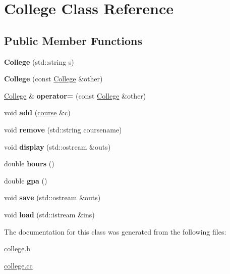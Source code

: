 \hypertarget{classCollege}{}\section{College Class Reference}
\label{classCollege}
\subsection*{Public Member Functions}
\begin{DoxyCompactItemize}
\item 
\hypertarget{classCollege_adabaf4087355e83f9f7d39f1e1498b41}{}\label{classCollege_adabaf4087355e83f9f7d39f1e1498b41} 
{\bfseries College} (std\+::string s)
\item 
\hypertarget{classCollege_ad007ad488e5a7ef986114080d0c8e101}{}\label{classCollege_ad007ad488e5a7ef986114080d0c8e101} 
{\bfseries College} (const \hyperlink{classCollege}{College} \&other)
\item 
\hypertarget{classCollege_af2194c9b37f80d13dc3fdba6784b18e8}{}\label{classCollege_af2194c9b37f80d13dc3fdba6784b18e8} 
\hyperlink{classCollege}{College} \& {\bfseries operator=} (const \hyperlink{classCollege}{College} \&other)
\item 
\hypertarget{classCollege_a67fd1d8970b46b24ce2e0dd72598a22f}{}\label{classCollege_a67fd1d8970b46b24ce2e0dd72598a22f} 
void {\bfseries add} (\hyperlink{classcourse}{course} \&c)
\item 
\hypertarget{classCollege_a4d2ae513b36e6421fb1ca2c08459cfe6}{}\label{classCollege_a4d2ae513b36e6421fb1ca2c08459cfe6} 
void {\bfseries remove} (std\+::string coursename)
\item 
\hypertarget{classCollege_a52ca0a164483cf5c05591cd0fb8b300c}{}\label{classCollege_a52ca0a164483cf5c05591cd0fb8b300c} 
void {\bfseries display} (std\+::ostream \&outs)
\item 
\hypertarget{classCollege_a8a7a762611a1d7e00c453390d49355fd}{}\label{classCollege_a8a7a762611a1d7e00c453390d49355fd} 
double {\bfseries hours} ()
\item 
\hypertarget{classCollege_aaf9bfaa0bc717e96da6365661a96fcd0}{}\label{classCollege_aaf9bfaa0bc717e96da6365661a96fcd0} 
double {\bfseries gpa} ()
\item 
\hypertarget{classCollege_af6b419f813bc990c0e11f99b78a26899}{}\label{classCollege_af6b419f813bc990c0e11f99b78a26899} 
void {\bfseries save} (std\+::ostream \&outs)
\item 
\hypertarget{classCollege_a11422094ddd907705daede7aa537dd73}{}\label{classCollege_a11422094ddd907705daede7aa537dd73} 
void {\bfseries load} (std\+::istream \&ins)
\end{DoxyCompactItemize}


The documentation for this class was generated from the following files\+:\begin{DoxyCompactItemize}
\item 
\hyperlink{college_8h}{college.\+h}\item 
\hyperlink{college_8cc}{college.\+cc}\end{DoxyCompactItemize}
